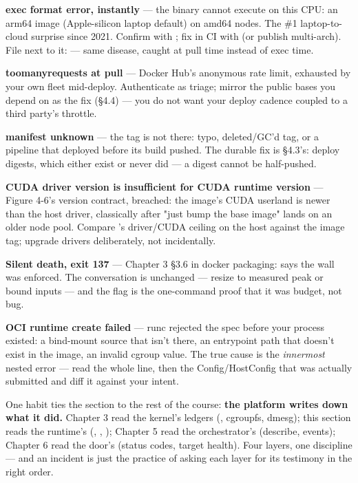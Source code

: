 \begin{tbbitemize}
  \item \textbf{exec format error, instantly} — the binary cannot execute on this CPU: an arm64 image (Apple-silicon laptop default) on amd64 nodes. The \#1 laptop-to-cloud surprise since 2021. Confirm with ; fix in CI with  (or publish multi-arch). File next to it:  — same disease, caught at pull time instead of exec time.
  \item \textbf{toomanyrequests at pull} — Docker Hub's anonymous rate limit, exhausted by your own fleet mid-deploy. Authenticate as triage; mirror the public bases you depend on as the fix (§4.4) — you do not want your deploy cadence coupled to a third party's throttle.
  \item \textbf{manifest unknown} — the tag is not there: typo, deleted/GC'd tag, or a pipeline that deployed before its build pushed. The durable fix is §4.3's: deploy digests, which either exist or never did — a digest cannot be half-pushed.
  \item \textbf{CUDA driver version is insufficient for CUDA runtime version} — Figure 4-6's version contract, breached: the image's CUDA userland is newer than the host driver, classically after "just bump the base image" lands on an older node pool. Compare 's driver/CUDA ceiling on the host against the image tag; upgrade drivers deliberately, not incidentally.
  \item \textbf{Silent death, exit 137} — Chapter 3 §3.6 in docker packaging:  says the  wall was enforced. The conversation is unchanged — resize to measured peak or bound inputs — and the flag is the one-command proof that it was budget, not bug.
  \item \textbf{OCI runtime create failed} — runc rejected the spec before your process existed: a bind-mount source that isn't there, an entrypoint path that doesn't exist in the image, an invalid cgroup value. The true cause is the \textit{innermost} nested error — read the whole line, then  the Config/HostConfig that was actually submitted and diff it against your intent.
\end{tbbitemize}

One habit ties the section to the rest of the course: \textbf{the platform writes down what it did.} Chapter 3 read the kernel's ledgers (, cgroupfs, dmesg); this section reads the runtime's (, , ); Chapter 5 read the orchestrator's (describe, events); Chapter 6 read the door's (status codes, target health). Four layers, one discipline — and an incident is just the practice of asking each layer for its testimony in the right order.

